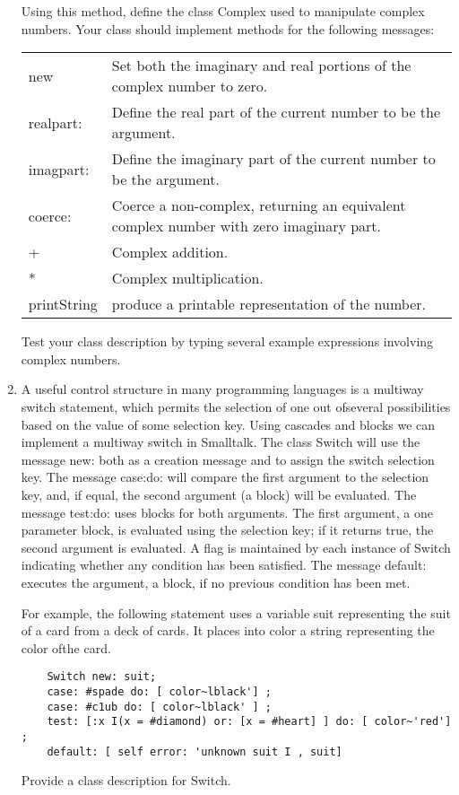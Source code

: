 \begin{enumerate}
Using this method, define the class Complex used to manipulate complex numbers.
Your class should implement methods for the following messages:

\noindent
\begin{tabular}{l p{8cm}}
    new & Set both the imaginary and real portions of the complex number to
    zero. \\
    realpart: & Define the real part of the current number to be the argument.
    \\
    imagpart: & Define the imaginary part of the current number to be the
    argument. \\
    coerce: & Coerce a non-complex, returning an equivalent complex number with
    zero imaginary part. \\
    + & Complex addition. \\
    * & Complex multiplication. \\
    printString & produce a printable representation of the number. \\
\end{tabular}

\noindent
Test your class description by typing several example expressions involving
complex numbers.

\item A useful control structure in many programming languages is a multiway
switch statement, which permits the selection of one out ofseveral possibilities
based on the value of some selection key. Using cascades and blocks we can
implement a multiway switch in Smalltalk. The class Switch will use the message
new: both as a creation message and to assign the switch selection key. The
message case:do: will compare the first argument to the selection key, and, if
equal, the second argument (a block) will be evaluated. The message test:do:
uses blocks for both arguments. The first argument, a one parameter block, is
evaluated using the selection key; if it returns true, the second argument is
evaluated. A flag is maintained by each instance of Switch indicating whether
any condition has been satisfied. The message default: executes the argument, a
block, if no previous condition has been met.

For example, the following statement uses a variable suit representing the suit
of a card from a deck of cards. It places into color a string representing the
color ofthe card.
\begin{lstlisting}
    Switch new: suit;
    case: #spade do: [ color~lblack'] ;
    case: #c1ub do: [ color~lblack' ] ;
    test: [:x I(x = #diamond) or: [x = #heart] ] do: [ color~'red'] ;
    default: [ self error: 'unknown suit I , suit]
\end{lstlisting}
Provide a class description for Switch.

\end{enumerate}

\secup
